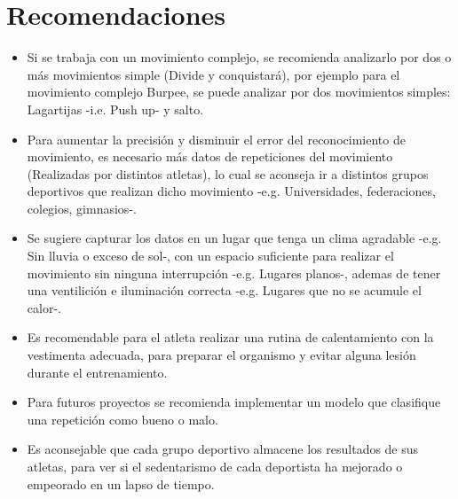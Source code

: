 \section{Recomendaciones} \label{ded:rec}
\begin{itemize}
\item Si se trabaja con un movimiento complejo, se recomienda analizarlo por dos o m\'as movimientos simple (Divide y conquistar\'a), por ejemplo para el movimiento complejo Burpee, se puede analizar por dos movimientos simples: Lagartijas -i.e. Push up- y salto.
\item Para aumentar la precisi\'on y disminuir el error del reconocimiento de movimiento, es necesario m\'as datos de  repeticiones del movimiento (Realizadas por distintos atletas), lo cual se aconseja ir a distintos grupos deportivos que realizan dicho movimiento -e.g. Universidades, federaciones, colegios, gimnasios-.
\item Se sugiere capturar los datos en un  lugar que tenga un clima agradable -e.g. Sin lluvia o exceso de sol-, con un espacio suficiente para realizar el movimiento sin ninguna interrupci\'on -e.g. Lugares planos-, ademas de tener una  ventilici\'on e iluminaci\'on correcta -e.g. Lugares que no se acumule  el calor-.
\item Es recomendable para el atleta realizar una rutina de calentamiento con la vestimenta adecuada, para preparar el organismo y evitar alguna lesi\'on durante el entrenamiento.
\item Para futuros proyectos se recomienda implementar un modelo que clasifique una repetici\'on como bueno o malo.
\item Es aconsejable que cada grupo deportivo almacene los resultados de sus atletas, para ver si el sedentarismo de cada deportista ha mejorado o empeorado en un lapso de tiempo.
\end{itemize}
